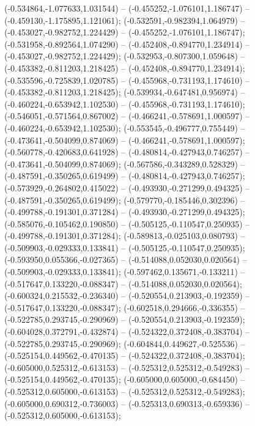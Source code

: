  (-0.534864,-1.077633,1.031544) -- (-0.455252,-1.076101,1.186747) -- (-0.459130,-1.175895,1.121061);
 (-0.532591,-0.982394,1.064979) -- (-0.453027,-0.982752,1.224429) -- (-0.455252,-1.076101,1.186747);
 (-0.531958,-0.892564,1.074290) -- (-0.452408,-0.894770,1.234914) -- (-0.453027,-0.982752,1.224429);
 (-0.532953,-0.807300,1.059648) -- (-0.453382,-0.811203,1.218425) -- (-0.452408,-0.894770,1.234914);
 (-0.535596,-0.725839,1.020785) -- (-0.455968,-0.731193,1.174610) -- (-0.453382,-0.811203,1.218425);
 (-0.539934,-0.647481,0.956974) -- (-0.460224,-0.653942,1.102530) -- (-0.455968,-0.731193,1.174610);
 (-0.546051,-0.571564,0.867002) -- (-0.466241,-0.578691,1.000597) -- (-0.460224,-0.653942,1.102530);
 (-0.553545,-0.496777,0.755449) -- (-0.473641,-0.504099,0.874069) -- (-0.466241,-0.578691,1.000597);
 (-0.560778,-0.420683,0.641928) -- (-0.480814,-0.427943,0.746257) -- (-0.473641,-0.504099,0.874069);
 (-0.567586,-0.343289,0.528329) -- (-0.487591,-0.350265,0.619499) -- (-0.480814,-0.427943,0.746257);
 (-0.573929,-0.264802,0.415022) -- (-0.493930,-0.271299,0.494325) -- (-0.487591,-0.350265,0.619499);
 (-0.579770,-0.185446,0.302396) -- (-0.499788,-0.191301,0.371284) -- (-0.493930,-0.271299,0.494325);
 (-0.585076,-0.105462,0.190850) -- (-0.505125,-0.110547,0.250935) -- (-0.499788,-0.191301,0.371284);
 (-0.589813,-0.025103,0.080793) -- (-0.509903,-0.029333,0.133841) -- (-0.505125,-0.110547,0.250935);
 (-0.593950,0.055366,-0.027365) -- (-0.514088,0.052030,0.020564) -- (-0.509903,-0.029333,0.133841);
 (-0.597462,0.135671,-0.133211) -- (-0.517647,0.133220,-0.088347) -- (-0.514088,0.052030,0.020564);
 (-0.600324,0.215532,-0.236340) -- (-0.520554,0.213903,-0.192359) -- (-0.517647,0.133220,-0.088347);
 (-0.602518,0.294666,-0.336355) -- (-0.522785,0.293745,-0.290969) -- (-0.520554,0.213903,-0.192359);
 (-0.604028,0.372791,-0.432874) -- (-0.524322,0.372408,-0.383704) -- (-0.522785,0.293745,-0.290969);
 (-0.604844,0.449627,-0.525536) -- (-0.525154,0.449562,-0.470135) -- (-0.524322,0.372408,-0.383704);
 (-0.605000,0.525312,-0.613153) -- (-0.525312,0.525312,-0.549283) -- (-0.525154,0.449562,-0.470135);
 (-0.605000,0.605000,-0.684450) -- (-0.525312,0.605000,-0.613153) -- (-0.525312,0.525312,-0.549283);
 (-0.605000,0.690312,-0.736003) -- (-0.525313,0.690313,-0.659336) -- (-0.525312,0.605000,-0.613153);
